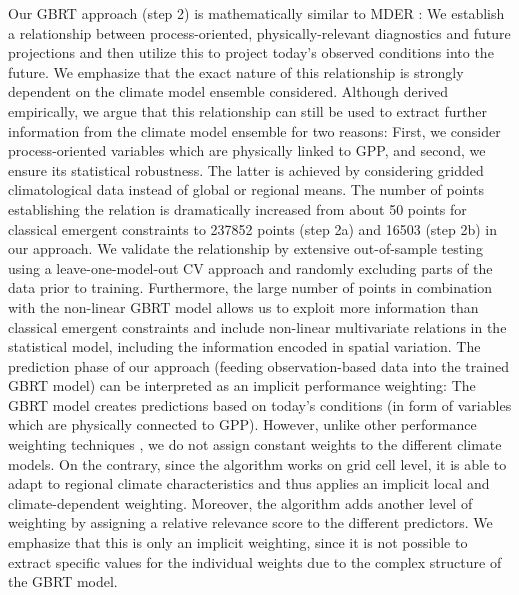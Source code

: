 Our \ac{GBRT} approach (step 2) is mathematically similar to \ac{MDER}
\autocite{Karpechko2013, Senftleben2020, Wenzel2016a}: We establish a
relationship between process-oriented, physically-relevant diagnostics and
future projections and then utilize this to project today's observed conditions
into the future. We emphasize that the exact nature of this relationship is
strongly dependent on the climate model ensemble considered. Although derived
empirically, we argue that this relationship can still be used to extract
further information from the climate model ensemble for two reasons: First, we
consider process-oriented variables which are physically linked to \ac{GPP},
and second, we ensure its statistical robustness. The latter is achieved by
considering gridded climatological data instead of global or regional means.
The number of points establishing the relation is dramatically increased from
about 50 points for classical emergent constraints to 237852 points (step 2a)
and 16503 (step 2b) in our approach. We validate the relationship by extensive
out-of-sample testing using a leave-one-model-out \ac{CV} approach and randomly
excluding parts of the data prior to training. Furthermore, the large number of
points in combination with the non-linear \ac{GBRT} model allows us to exploit
more information than classical emergent constraints and include non-linear
multivariate relations in the statistical model, including the information
encoded in spatial variation. The prediction phase of our approach (feeding
observation-based data into the trained \ac{GBRT} model) can be interpreted as
an implicit performance weighting: The \ac{GBRT} model creates predictions
based on today's conditions (in form of variables which are physically
connected to \ac{GPP}). However, unlike other performance weighting techniques
\autocite{Knutti2017a, Sanderson2017}, we do not assign constant weights to the
different climate models. On the contrary, since the algorithm works on grid
cell level, it is able to adapt to regional climate characteristics and thus
applies an implicit local and climate-dependent weighting. Moreover, the
algorithm adds another level of weighting by assigning a relative relevance
score to the different predictors. We emphasize that this is only an implicit
weighting, since it is not possible to extract specific values for the
individual weights due to the complex structure of the \ac{GBRT} model.

